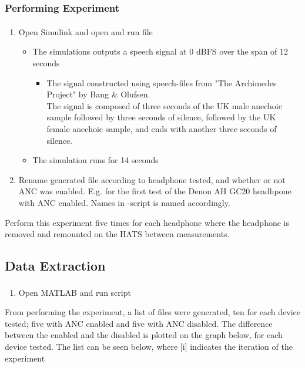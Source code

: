 	\subsubsection{Performing Experiment}
	\begin{enumerate}
		\item Open Simulink\textsuperscript{\textregistered} and open and run file 
		\begin{itemize} 
			\item The simulations outputs a speech signal at 0 dBFS over the span of 12 seconds
			\begin{itemize}
				\item [] The signal constructed using speech-files from "The Archimedes Project" by Bang \& Olufsen. \\
				The signal is composed of three seconds of the UK male anechoic sample followed by three seconds of silence, followed by the UK female anechoic sample, and ends with another three seconds of silence.
			\end{itemize}
			\item The simulation runs for 14 seconds
		\end{itemize}
		\item Rename generated file  according to headphone tested, and whether or not ANC was enabled. E.g.  for the first test of the Denon AH GC20 headhpone with ANC enabled. Names in -script is named accordingly.

	\end{enumerate}
	Perform this experiment five times for each headphone where the headphone is removed and remounted on the HATS between measurements. 
		
\subsection{Data Extraction}
\begin{enumerate}
	\item Open MATLAB\textsuperscript{\textregistered} and run script 
\end{enumerate}

From performing the experiment, a list of files were generated, ten for each device tested; five with ANC enabled and five with ANC disabled.
The difference between the enabled and the disabled is plotted on the graph below, for each device tested. The list can be seen below, where [i] indicates the iteration of the experiment

